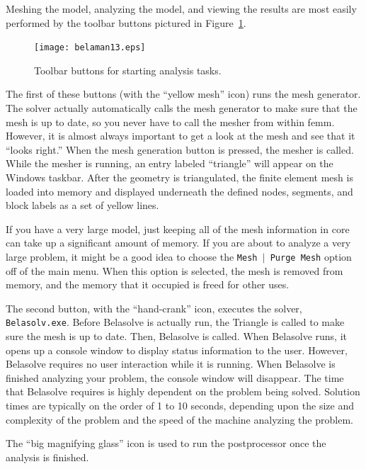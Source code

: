 \documentclass[12pt]{report}
\begin{document}
Meshing the model, analyzing the model, and viewing the results are
most easily performed by the toolbar buttons pictured in
Figure~\ref{fig13}.

\begin{figure}[htbp]
\centerline{\texttt{[image: belaman13.eps]}}
\caption{Toolbar buttons for starting analysis tasks.}
\label{fig13}
\end{figure}

The first of these buttons (with the ``yellow mesh'' icon) runs the
mesh generator. The solver actually automatically calls the mesh
generator to make sure that the mesh is up to date, so you never
have to call the mesher from within femm. However, it is almost
always important to get a look at the mesh and see that it ``looks
right.'' When the mesh generation button is pressed, the mesher is
called. While the mesher is running, an entry labeled ``triangle''
will appear on the Windows taskbar. After the geometry is
triangulated, the finite element mesh is loaded into memory and
displayed underneath the defined nodes, segments, and block labels
as a set of yellow lines.

If you have a very large model, just keeping all of the mesh
information in core can take up a significant amount of memory. If
you are about to analyze a very large problem, it might be a good
idea to choose the \texttt{Mesh $\vert $ Purge Mesh} option off of
the main menu. When this option is selected, the mesh is removed
from memory, and the memory that it occupied is freed for other
uses.

The second button, with the ``hand-crank'' icon, executes the solver,
\texttt{Belasolv.exe}. Before Belasolve is actually run, the Triangle is
called to make sure the mesh is up to date. Then, Belasolve is called. When
Belasolve runs, it opens up a console window to display status information
to the user. However, Belasolve requires no user interaction while it is
running. When Belasolve is finished analyzing your problem, the console
window will disappear. The time that Belasolve requires is highly dependent
on the problem being solved. Solution times are typically on the order of 1
to 10 seconds, depending upon the size and complexity of the problem and the
speed of the machine analyzing the problem.

The ``big magnifying glass'' icon is used to run the postprocessor once the
analysis is finished.



\end{document}
